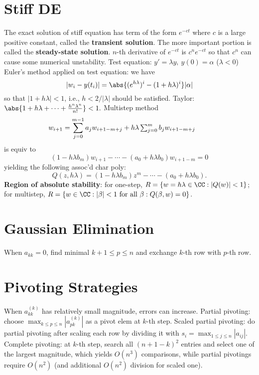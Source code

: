 \documentclass[b4paper,10pt]{memoir}
\begin{document}
\begin{multicols*}{3}
    \section{Stiff DE}
    \s The exact solution of stiff equation has term of the form $e^{-ct}$ where $c$ is a large positive constant, called the \textbf{transient solution}. The more important portion is called the \textbf{steady-state solution}.\nl
    \s $n$-th derivative of $e^{-ct}$ is $c^n e^{-ct}$ so that $c^n$ can cause some numerical unstability. \nl
    \s Test equation: $y' = \lambda y,\  y(0) =\alpha$ ($\lambda<0$)\nl
    \s Euler's method applied on test equation: we have
    \[ |w_i - y(t_i)| = \abs{(e^{h\lambda})^i - (1+h\lambda)^i} |\alpha| \]
    so that $|1 + h\lambda| < 1$, i.e., $h < 2/|\lambda|$ should be satisfied. \nl
    \s Taylor:
    $ \abs{1 + h\lambda+\cdots + \frac{h^n\lambda^n}{n!}}<1. $\nl
    \s Multistep method
    \[\mkern-40mu w_{i+1} = \sum_{j=0}^{m-1} a_j w_{i+1-m+j} +h\lambda\textstyle\sum_{j=0}^m b_j w_{i+1-m+j}\]
    is equiv to
    \[ (1-h\lambda b_m)w_{i+1}-\cdots -(a_0 + h\lambda b_0)w_{i+1-m}=0 \]
    yielding the following assoc'd char poly:
    \[ Q(z,h\lambda) = (1-h\lambda b_m)z^m -\cdots -(a_0+h\lambda b_0). \]
    \s \textbf{Region of absolute stability}: for one-step, $R=\{ w=h\lambda\in\CC : |Q(w)|<1 \}$; for multistep, $R=\{w\in\CC:|\beta|<1\text{ for all }\beta:Q(\beta,w)=0 \}$.

    \setcounter{chapter}{6}
    \setcounter{section}{0}
    \section{Gaussian Elimination}
    \s When $a_{kk}=0$, find minimal $k+1\le p\le n$ and exchange $k$-th row with $p$-th row.

    \section{Pivoting Strategies}
    \s When $a_{kk}^{(k)}$ has relatively small magnitude, errors can increase.\nl
    \s Partial pivoting: choose $\max_{k\le p\le n}|a_{pk}^{(k)}|$ as a pivot elem at $k$-th step. \nl
    \s Scaled partial pivoting: do partial pivoting after scaling each row by dividing it with $s_i = \max_{1\le j\le n}|a_{ij}|$.\nl
    \s Complete pivoting: at $k$-th step, search all $(n+1-k)^2$ entries and select one of the largest magnitude, which yields $O(n^3)$ comparisons, while partial pivotings require $O(n^2)$ (and additional $O(n^2)$ division for scaled one).


\end{multicols*}
\end{document}
